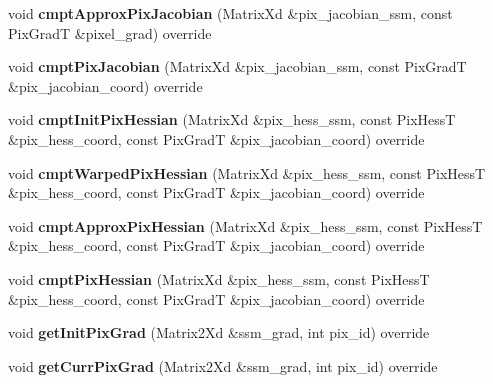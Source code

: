 \begin{DoxyCompactItemize}
\item 
\hypertarget{classTranslation_a9408ce7ef172a1d70e0608d314cad1c3}{void {\bfseries cmpt\-Approx\-Pix\-Jacobian} (Matrix\-Xd \&pix\-\_\-jacobian\-\_\-ssm, const Pix\-Grad\-T \&pixel\-\_\-grad) override}\label{classTranslation_a9408ce7ef172a1d70e0608d314cad1c3}

\item 
\hypertarget{classTranslation_a943715a550e88f67f0ca3bbcaa309503}{void {\bfseries cmpt\-Pix\-Jacobian} (Matrix\-Xd \&pix\-\_\-jacobian\-\_\-ssm, const Pix\-Grad\-T \&pix\-\_\-jacobian\-\_\-coord) override}\label{classTranslation_a943715a550e88f67f0ca3bbcaa309503}

\item 
\hypertarget{classTranslation_a9cf7033460862155bc5c168be6b63a08}{void {\bfseries cmpt\-Init\-Pix\-Hessian} (Matrix\-Xd \&pix\-\_\-hess\-\_\-ssm, const Pix\-Hess\-T \&pix\-\_\-hess\-\_\-coord, const Pix\-Grad\-T \&pix\-\_\-jacobian\-\_\-coord) override}\label{classTranslation_a9cf7033460862155bc5c168be6b63a08}

\item 
\hypertarget{classTranslation_a24f3c3998a8ae9363dc8adf4457ae001}{void {\bfseries cmpt\-Warped\-Pix\-Hessian} (Matrix\-Xd \&pix\-\_\-hess\-\_\-ssm, const Pix\-Hess\-T \&pix\-\_\-hess\-\_\-coord, const Pix\-Grad\-T \&pix\-\_\-jacobian\-\_\-coord) override}\label{classTranslation_a24f3c3998a8ae9363dc8adf4457ae001}

\item 
\hypertarget{classTranslation_a7c9710134b26f874b90aacacc6aa12eb}{void {\bfseries cmpt\-Approx\-Pix\-Hessian} (Matrix\-Xd \&pix\-\_\-hess\-\_\-ssm, const Pix\-Hess\-T \&pix\-\_\-hess\-\_\-coord, const Pix\-Grad\-T \&pix\-\_\-jacobian\-\_\-coord) override}\label{classTranslation_a7c9710134b26f874b90aacacc6aa12eb}

\item 
\hypertarget{classTranslation_a9f1fb805967eab1e264c9fb17dce2df4}{void {\bfseries cmpt\-Pix\-Hessian} (Matrix\-Xd \&pix\-\_\-hess\-\_\-ssm, const Pix\-Hess\-T \&pix\-\_\-hess\-\_\-coord, const Pix\-Grad\-T \&pix\-\_\-jacobian\-\_\-coord) override}\label{classTranslation_a9f1fb805967eab1e264c9fb17dce2df4}

\item 
\hypertarget{classTranslation_a8bef975225a4d0b0b780a98f5d66fccb}{void {\bfseries get\-Init\-Pix\-Grad} (Matrix2\-Xd \&ssm\-\_\-grad, int pix\-\_\-id) override}\label{classTranslation_a8bef975225a4d0b0b780a98f5d66fccb}

\item 
\hypertarget{classTranslation_ab024434d34849b458689f0733e7c4324}{void {\bfseries get\-Curr\-Pix\-Grad} (Matrix2\-Xd \&ssm\-\_\-grad, int pix\-\_\-id) override}\label{classTranslation_ab024434d34849b458689f0733e7c4324}


\end{DoxyCompactItemize}
